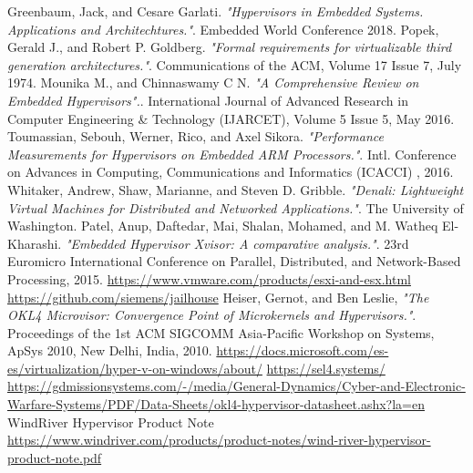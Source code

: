 \documentclass[spanish,12pt,a4paper,oneside]{book}
\begin{document}
\begin{thebibliography}{00}
	  Greenbaum, Jack, and Cesare Garlati. \emph{"Hypervisors in Embedded Systems. Applications and Architechtures."}. Embedded World Conference 2018.
	 Popek, Gerald J., and Robert P. Goldberg. \emph{"Formal requirements for virtualizable third generation architectures."}. Communications of the ACM, Volume 17 Issue 7, July 1974.
	 Mounika M., and Chinnaswamy C N. \emph{"A Comprehensive Review on Embedded Hypervisors".}. International Journal of Advanced Research in Computer Engineering \& Technology (IJARCET), Volume 5 Issue 5, May 2016.
	 Toumassian, Sebouh, Werner, Rico, and Axel Sikora. \emph{"Performance Measurements for Hypervisors on Embedded ARM Processors."}. Intl. Conference on Advances in Computing, Communications and Informatics (ICACCI) , 2016.
	 Whitaker, Andrew, Shaw, Marianne, and Steven D. Gribble. \emph{"Denali: Lightweight Virtual Machines for Distributed and Networked Applications."}. The University of Washington.
   Patel, Anup, Daftedar, Mai, Shalan, Mohamed, and M. Watheq El-Kharashi. \emph{"Embedded Hypervisor Xvisor: A comparative analysis."}. 23rd Euromicro International Conference on Parallel, Distributed, and Network-Based Processing, 2015.
   \url{https://www.vmware.com/products/esxi-and-esx.html}
   \url{https://github.com/siemens/jailhouse}
   Heiser, Gernot, and Ben Leslie, \emph{"The OKL4 Microvisor: Convergence Point of Microkernels and Hypervisors."}. Proceedings of the 1st ACM SIGCOMM Asia-Pacific Workshop on Systems, ApSys 2010, New Delhi, India, 2010.
   \url{https://docs.microsoft.com/es-es/virtualization/hyper-v-on-windows/about/}
   \url{https://sel4.systems/}
   \url{https://gdmissionsystems.com/-/media/General-Dynamics/Cyber-and-Electronic-Warfare-Systems/PDF/Data-Sheets/okl4-hypervisor-datasheet.ashx?la=en}
   WindRiver Hypervisor Product Note \url{https://www.windriver.com/products/product-notes/wind-river-hypervisor-product-note.pdf}



\end{thebibliography}
\end{document}

